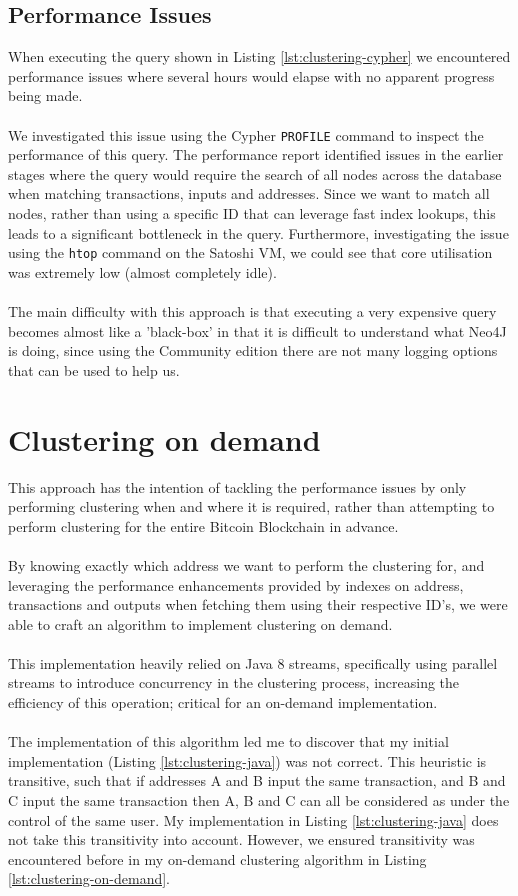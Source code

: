 \subsection{Performance Issues}
When executing the query shown in Listing \ref{lst:clustering-cypher} we encountered performance issues where several hours would elapse with no apparent progress being made. 
\\\\
We investigated this issue using the Cypher \texttt{PROFILE} command to inspect the performance of this query. The performance report identified issues in the earlier stages where the query would require the search of all nodes across the database when matching transactions, inputs and addresses. Since we want to match all nodes, rather than using a specific ID that can leverage fast index lookups, this leads to a significant bottleneck in the query. Furthermore, investigating the issue using the \texttt{htop} command on the Satoshi VM, we could see that core utilisation was extremely low (almost completely idle).
\\\\
The main difficulty with this approach is that executing a very expensive query becomes almost like a 'black-box' in that it is difficult to understand what Neo4J is doing, since using the Community edition there are not many logging options that can be used to help us.

\section{Clustering on demand}
This approach has the intention of tackling the performance issues by only performing clustering when and where it is required, rather than attempting to perform clustering for the entire Bitcoin Blockchain in advance. 
\\\\
By knowing exactly which address we want to perform the clustering for, and leveraging the performance enhancements provided by indexes on address, transactions and outputs when fetching them using their respective ID's, we were able to craft an algorithm to implement clustering on demand.
\\\\
This implementation heavily relied on Java 8 streams, specifically using parallel streams to introduce concurrency in the clustering process, increasing the efficiency of this operation; critical for an on-demand implementation. 
\\\\
The implementation of this algorithm led me to discover that my initial implementation (Listing \ref{lst:clustering-java}) was not correct. This heuristic is transitive, such that if addresses A and B input the same transaction, and B and C input the same transaction then A, B and C can all be considered as under the control of the same user. My implementation in Listing \ref{lst:clustering-java} does not take this transitivity into account. However, we ensured transitivity was encountered before in my on-demand clustering algorithm in Listing \ref{lst:clustering-on-demand}.

